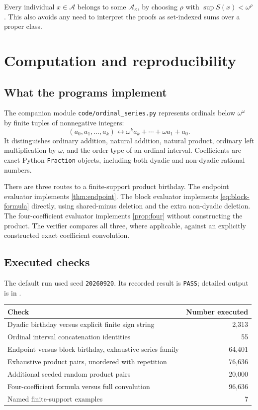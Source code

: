 \documentclass[11pt,letterpaper]{article}
\theoremstyle{definition}
\theoremstyle{remark}
\newcommand{\A}{\mathscr{A}}
\begin{document}
Every individual \(x\in\A\) belongs to some \(\A_\kappa\), by choosing
\(\rho\) with \(\sup S(x)<\omega^\rho\). This also avoids any need
to interpret the proofs as set-indexed sums over a proper class.

\section{Computation and reproducibility}\label{sec:computations}

\subsection{What the programs implement}
The companion module \texttt{code/ordinal\_series.py} represents ordinals
below \(\omega^\omega\) by finite tuples of nonnegative integers:
\[
 (a_0,a_1,\ldots,a_k)\longleftrightarrow
       \omega^k a_k+\cdots+\omega a_1+a_0.
\]
It distinguishes ordinary addition, natural addition, natural product,
ordinary left multiplication by \(\omega\), and the order type of an
ordinal interval. Coefficients are exact Python \texttt{Fraction} objects,
including both dyadic and non-dyadic rational numbers.

There are three routes to a finite-support product birthday.
The endpoint evaluator implements \cref{thm:endpoint}. The block evaluator
implements \eqref{eq:block-formula} directly, using shared-minus deletion
and the extra non-dyadic deletion. The four-coefficient evaluator implements
\cref{prop:four} without constructing the product. The verifier compares
all three, where applicable, against an explicitly constructed exact
coefficient convolution.

\subsection{Executed checks}
The default run used seed \texttt{20260920}. Its recorded result is
\texttt{PASS}; detailed output is in .
\begin{center}
\renewcommand{\arraystretch}{1.18}
\begin{tabular}{@{}lr@{}}
\toprule
\textbf{Check} & \textbf{Number executed}\\
\midrule
Dyadic birthday versus explicit finite sign string & 2,313\\
Ordinal interval concatenation identities & 55\\
Endpoint versus block birthday, exhaustive series family & 64,401\\
Exhaustive product pairs, unordered with repetition & 76,636\\
Additional seeded random product pairs & 20,000\\
Four-coefficient formula versus full convolution & 96,636\\
Named finite-support examples & 7\\
\bottomrule
\end{tabular}
\end{center}
\end{document}
